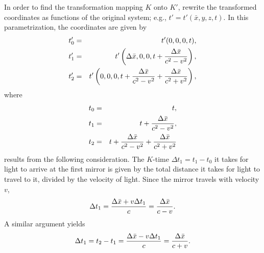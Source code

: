 In order to find the transformation mapping $K$ onto $K'$,
rewrite the transformed coordinates as functions of the original system; e.g.,
$t'=t'(\bar{x},y,z,t)$.
In this parametrization, the coordinates are given by
\begin{eqnarray}
t'_0 &=& t' (0,0,0,t),
\label{e2-2001-conven}
\\
t'_1 &=& t' \left( \Delta\bar{x},0,0,t+{\Delta \bar{x} \over c^2-v^2}\right ),
\label{e3-2001-conven}
\\
t'_2 &=& t' \left( 0,0,0,t+{\Delta \bar{x} \over c^2-v^2}+{\Delta \bar{x} \over c^2+v^2}\right ),
\label{e4-2001-conven}
\end{eqnarray}
where
\begin{eqnarray}
t_0 &=& t, \nonumber \\
t_1 &=& t+{\Delta \bar{x} \over c^2-v^2} ,\nonumber \\
t_2 &=& t+{\Delta \bar{x} \over c^2-v^2}+{\Delta \bar{x} \over c^2+v^2} \nonumber
\end{eqnarray}
results from the following consideration.
The $K$-time $\Delta t_1 =t_1-t_0$ it takes for light to arrive at the
first mirror
is given by the total distance it takes for light to travel to it,
divided by the velocity of light.
Since the mirror travels with velocity
$v$,
\begin{equation}
\Delta t_1 ={\Delta \bar{x} +v \Delta t_1\over c}={\Delta \bar{x}\over c-v}.
\label{e4a-2001-conven}
\end{equation}
A similar argument yields
$$
\Delta t_1 = t_2-t_1=
{\Delta \bar{x} -v \Delta t_1\over c}={\Delta \bar{x}\over c+v}.
$$

